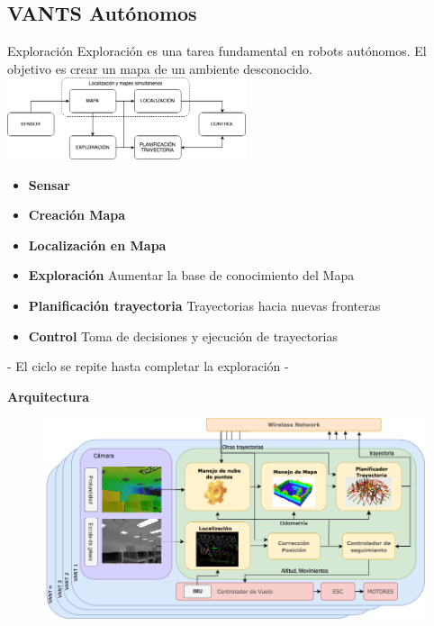 \documentclass[
  24pt, %
  aspectratio=169, %
]{beamer}
\begin{document}
\subsection{VANTS Autónomos}
\begin{frame}{Exploración}
  \bigskip %
  Exploración es una tarea fundamental en robots autónomos. El objetivo es crear un mapa de un ambiente desconocido.\\
  \bigskip %
  \centering
  \includegraphics[width=7cm]{exploracion}\\
  
  \begin{itemize}
  \item \textbf{Sensar}
  \item \textbf{Creación Mapa} 
  \item \textbf{Localización en Mapa}
  \item \textbf{Exploración} Aumentar la base de conocimiento del Mapa
  \item \textbf{Planificación trayectoria} Trayectorias hacia nuevas fronteras 
  \item \textbf{Control} Toma de decisiones y ejecución de trayectorias 
  \end{itemize}

  \alert{- El ciclo se repite hasta completar la exploración -}
  
\end{frame}

\begin{frame}
  \textbf{Arquitectura}
  \begin{figure}
    \centering
    \includegraphics[width=15cm]{arquitectura}
  \end{figure}
\end{frame}
\end{document}
